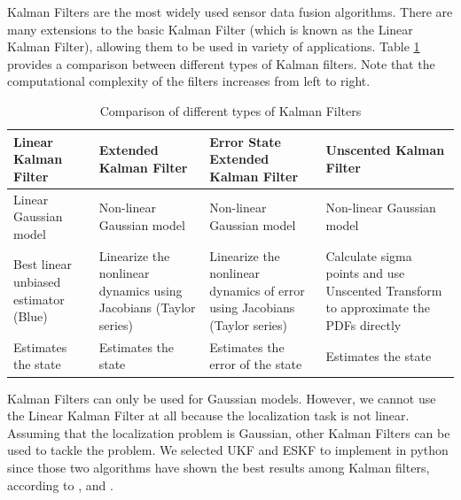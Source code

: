 Kalman Filters are the most widely used sensor data fusion algorithms. There 
are many extensions to the basic Kalman Filter (which is known as the Linear Kalman Filter), allowing them to be used in variety of applications. Table \ref{table:ch:KalmanFilterComparison} provides a 
comparison between different types of Kalman filters. Note that the computational complexity of the filters increases from left to right.
\begin{table}[h]
	\centering
	\begin{tabular}{|p{3.4cm}|p{3.4cm}|p{3.4cm}|p{3.4cm}|} 
		\hline
		\textbf{Linear Kalman Filter} & \textbf{Extended Kalman Filter} & \textbf{Error State Extended Kalman Filter} & \textbf{Unscented Kalman Filter} \\
		\hline
		Linear Gaussian model&Non-linear Gaussian model&Non-linear  Gaussian model&Non-linear Gaussian model\\
		\hline
		Best linear unbiased estimator (Blue)&Linearize the nonlinear dynamics using Jacobians (Taylor series)&Linearize the nonlinear 
		dynamics of error using Jacobians (Taylor series)&Calculate sigma points and use Unscented Transform to approximate the \gls{PDF}s directly\\
		\hline
		Estimates the state & Estimates the state& Estimates the error of the state & Estimates the state\\
		\hline
	\end{tabular}
	\caption{Comparison of different types of Kalman Filters}
	\label{table:ch:KalmanFilterComparison}
	\vspace{0.5cm}
\end{table}

Kalman Filters can only be used for Gaussian models. However, we cannot use the Linear Kalman Filter at all because the localization task is not linear. Assuming that the localization problem is Gaussian, other Kalman Filters can be used to tackle the problem. We selected  \gls{UKF} and \gls{ESKF} to implement in python since those two algorithms have shown the best results among Kalman filters, according to \cite{ch24:st2004comparison},\cite{ch25:madyastha2011extended} and \cite{ch26:wan2000unscented}.

